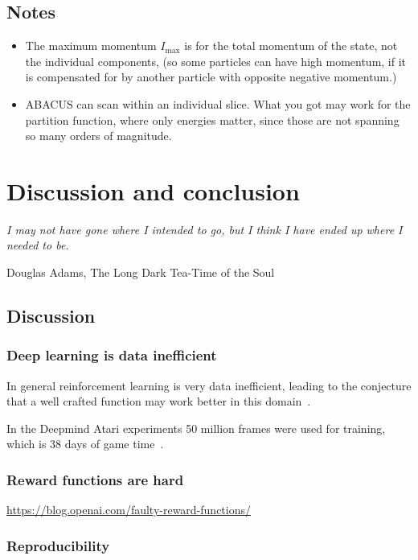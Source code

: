 \documentclass[11pt, a4paper]{report} %
\begin{document}
\section{Notes}
\begin{itemize}
\item
The maximum momentum $I_{\max}$ is for the total momentum of the state, not the individual components, (so some particles can have high momentum, if it is compensated for by another particle with opposite negative momentum.)
\item
ABACUS can scan within an individual slice.
What you got may work for the partition function, where only energies matter, since those are not spanning so many orders of magnitude.
\end{itemize}





\chapter{Discussion and conclusion}\label{chap:conclusion}

\epigraph{\textit{I may not have gone where I intended to go, but I think I have ended up where I needed to be.}}{Douglas Adams, The Long Dark Tea-Time of the Soul}

\section{Discussion}

\subsection{Deep learning is data inefficient}

In general reinforcement learning is very data inefficient, leading to the conjecture that a well crafted function may work better in this domain~\cite{1710.02298}.

In the Deepmind Atari experiments 50 million frames were used for training, which is 38 days of game time~\cite{mnih15_human_level_contr_throug_deep_reinf_learn}.

\subsection{Reward functions are hard}

\url{https://blog.openai.com/faulty-reward-functions/}

\subsection{Reproducibility}
\end{document}
